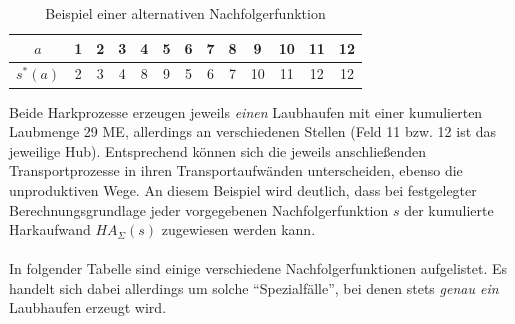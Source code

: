 \documentclass[fontsize=12pt,doubleside,openany,listof=totoc,listof=flat,listof=nochaptergap,numbers=noenddot]{scrbook}
\theoremstyle{style}
\begin{document}
\renewcommand{\arraystretch}{0.8}
\begin{table}[H]
\caption{Beispiel einer alternativen Nachfolgerfunktion}
\label{HJKmlp_table_AlternativeNachfolgerfunktion}
\centering 
\begin{tabular}{|>{}c|>{}c|>{}c|>{}c|>{}c|>{}c|>{}c|>{}c|>{}c|>{}c|>{}c|>{}c|>{}c|}
\hline
$a$ & 1&2 &3 &4 &5 & 6 & 7 & 8 & 9 & 10 & 11 & 12\\
\hline
$s^*(a)$ & 2 &  3 & 4 & 8 & 9 & 5 & 6 & 7 & 10 & 11 & 12 & 12\\
\hline
\end{tabular}
\end{table}
\renewcommand{\arraystretch}{1}

\noindent Beide Harkprozesse erzeugen jeweils \textit{einen} Laubhaufen mit einer
kumulierten Laubmenge 29 ME, allerdings an verschiedenen Stellen (Feld 11 bzw. 12 ist das jeweilige Hub). Entsprechend können sich die jeweils anschließenden Transportprozesse in ihren Transportaufwänden unterscheiden, ebenso die unproduktiven Wege. An diesem Beispiel wird deutlich, dass bei festgelegter Berechnungsgrundlage jeder vorgegebenen Nachfolgerfunktion $s$ der kumulierte Harkaufwand $HA_\Sigma (s)$ zugewiesen werden kann. \\
\\
In folgender Tabelle sind einige verschiedene Nachfolgerfunktionen aufgelistet.
Es handelt sich dabei allerdings um solche "`Spezialfälle"', bei denen stets
\textit{genau ein} Laubhaufen erzeugt wird. 
\end{document}
